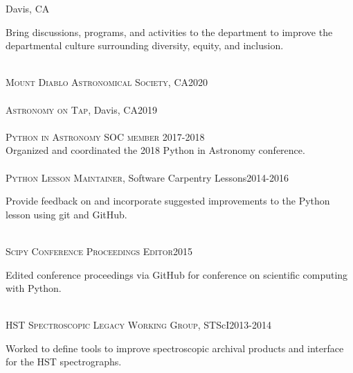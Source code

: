 \documentclass[10pt]{cv}
\begin{document}
\begin{llist}
Davis, CA \\
\begin{minipage}[l]{0.7\textwidth}\vspace{0.15cm}
Bring discussions, programs, and activities to the department to improve the departmental culture surrounding diversity, equity, and inclusion.\\
\end{minipage}\vspace{0.15cm}
\\
\textsc{Mount Diablo Astronomical Society}, CA\hfill 2020\\
\\
\textsc{Astronomy on Tap}, Davis, CA\hfill 2019\\
%
\\
\textsc{Python in Astronomy SOC member} \hfill 2017-2018\\
Organized and coordinated the 2018 Python in Astronomy conference.\\
\\
\textsc{Python Lesson Maintainer}, Software Carpentry Lessons\hfill 2014-2016\\
\begin{minipage}[l]{0.7\textwidth}\vspace{0.15cm}
Provide feedback on and incorporate suggested improvements to the Python lesson using git and GitHub.\\
\end{minipage}\vspace{0.15cm}
\\
\textsc{Scipy Conference Proceedings Editor}\hfill 2015\\
\begin{minipage}[l]{0.7\textwidth}\vspace{0.15cm}
Edited conference proceedings via GitHub for conference on scientific computing with Python.\\
\end{minipage}\vspace{0.15cm}
\\
\textsc{HST Spectroscopic Legacy Working Group}, STScI\hfill2013-2014\\
\begin{minipage}[l]{0.7\textwidth}\vspace{0.15cm}
Worked to define tools to improve spectroscopic archival products and interface for the HST spectrographs.\\
\end{minipage}\vspace{0.15cm}

\end{llist}
\end{document}
